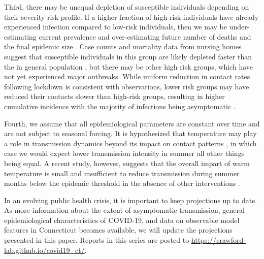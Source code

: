 \documentclass[11pt]{article}
\begin{document}
Third, there may be unequal depletion of susceptible individuals depending on their severity risk profile. If a higher fraction of high-risk individuals have already experienced infection compared to low-risk individuals, then we may be under-estimating current prevalence and over-estimating future number of deaths and the final epidemic size \citep{gomes2020individual, britton2020disease}. Case counts and mortality data from nursing homes suggest that susceptible individuals in this group are likely depleted faster than the in general population \citep{DPHwebsitenursing}, but there may be other high risk groups, which have not yet experienced major outbreaks. While uniform reduction in contact rates following lockdown is consistent with observations, lower risk groups may have reduced their contacts slower than high-risk groups, resulting in higher cumulative incidence with the majority of infections being asymptomatic \citep{campbell2020prevalence}.

Fourth, we assume that all epidemiological parameters are constant over time and are not subject to seasonal forcing. It is hypothesized that temperature may play a role in transmission dynamics beyond its impact on contact patterns \citep{kissler2020projecting}, in which case we would expect lower transmission intensity in summer all other things being equal. A recent study, however, suggests that the overall impart of warm temperature is small and insufficient to reduce transmission during summer months below the epidemic threshold in the absence of other interventions \citep{xu2020modest}.

In an evolving public health crisis, it is important to keep projections up to date. As more information about the extent of asymptomatic transmission, general epidemiological characteristics of COVID-19, and data on observable model features in Connecticut becomes available, we will update the projections presented in this paper. Reports in this series are posted to \url{https://crawford-lab.github.io/covid19_ct/}. 








\end{document}
